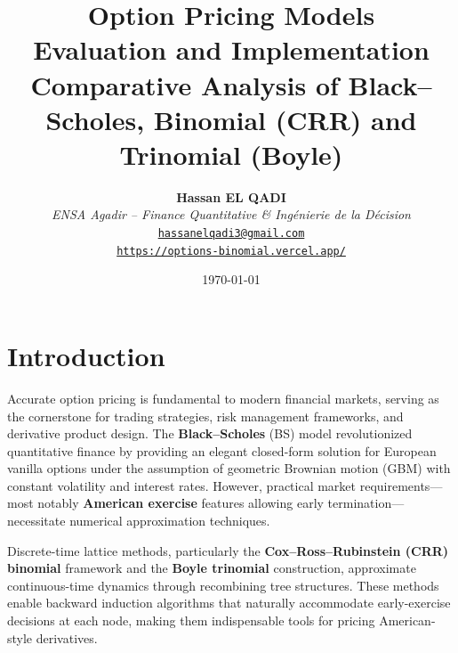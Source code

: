 \documentclass[10pt,twocolumn]{article}
\title{
    \color{primary}\textbf{\LARGE Option Pricing Models}\\[0.3cm]
    \large\textbf{Evaluation and Implementation}\\[0.2cm]
    \normalsize Comparative Analysis of Black--Scholes, Binomial (CRR) and Trinomial (Boyle)
}
\author{
    \textbf{Hassan EL QADI}\\[0.1cm]
    \textit{ENSA Agadir -- Finance Quantitative \& Ingénierie de la Décision}\\[0.1cm]
    \href{mailto:hassanelqadi3@gmail.com}{\texttt{hassanelqadi3@gmail.com}}\\[0.05cm]
    \href{https://options-binomial.vercel.app/}{\textcolor{accent1}{\texttt{https://options-binomial.vercel.app/}}}
}
\date{\today}
\begin{document}

\section{Introduction}

Accurate option pricing is fundamental to modern financial markets, serving as the cornerstone for trading strategies, risk management frameworks, and derivative product design. The \textbf{Black--Scholes} (BS) model revolutionized quantitative finance by providing an elegant closed-form solution for European vanilla options under the assumption of geometric Brownian motion (GBM) with constant volatility and interest rates. However, practical market requirements---most notably \textbf{American exercise} features allowing early termination---necessitate numerical approximation techniques.

Discrete-time lattice methods, particularly the \textbf{Cox--Ross--Rubinstein (CRR) binomial} framework and the \textbf{Boyle trinomial} construction, approximate continuous-time dynamics through recombining tree structures. These methods enable backward induction algorithms that naturally accommodate early-exercise decisions at each node, making them indispensable tools for pricing American-style derivatives.
\end{document}
